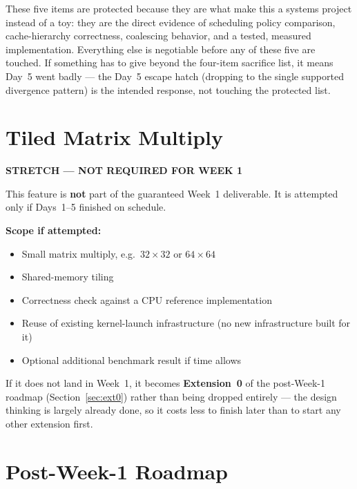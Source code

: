 \documentclass[11pt]{article}
\newcommand{\stretchtag}{\textcolor{warnred}{\textbf{STRETCH --- NOT REQUIRED FOR WEEK 1}}}
\begin{document}
These five items are protected because they are what make this a systems
project instead of a toy: they are the direct evidence of scheduling
policy comparison, cache-hierarchy correctness, coalescing behavior, and a
tested, measured implementation. Everything else is negotiable before any
of these five are touched. If something has to give beyond the four-item
sacrifice list, it means Day~5 went badly --- the Day~5 escape hatch
(dropping to the single supported divergence pattern) is the intended
response, not touching the protected list.

\section{Tiled Matrix Multiply}
\label{sec:matmul-stretch}

\begin{center}
\stretchtag
\end{center}

This feature is \textbf{not} part of the guaranteed Week~1 deliverable. It
is attempted only if Days~1--5 finished on schedule.

\textbf{Scope if attempted:}
\begin{itemize}[leftmargin=1.2cm]
  \item Small matrix multiply, e.g.\ $32\times32$ or $64\times64$
  \item Shared-memory tiling
  \item Correctness check against a CPU reference implementation
  \item Reuse of existing kernel-launch infrastructure (no new
  infrastructure built for it)
  \item Optional additional benchmark result if time allows
\end{itemize}

If it does not land in Week~1, it becomes \textbf{Extension~0} of the
post-Week-1 roadmap (Section~\ref{sec:ext0}) rather than being dropped
entirely --- the design thinking is largely already done, so it costs less
to finish later than to start any other extension first.

\section{Post-Week-1 Roadmap}
\label{sec:post-week1}
\end{document}
